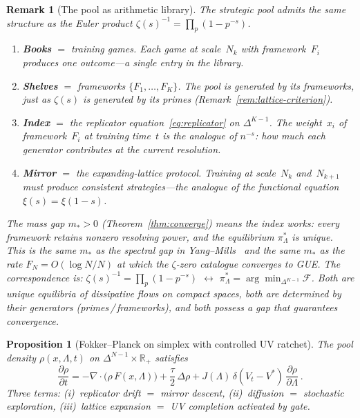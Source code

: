 \documentclass[11pt,a4paper]{article}
\newtheorem{proposition}[theorem]{Proposition}
\newtheorem{remark}[theorem]{Remark}
\begin{document}
\begin{remark}[The pool as arithmetic library]%
\label{rem:pool-library}
The strategic pool admits the same structure as the
Euler product $\zeta(s)^{-1} = \prod_p (1 - p^{-s})$.
\begin{enumerate}[nosep, label=\textup{(\roman*)}]
\item \textbf{Books} $=$ training games.
  Each game at scale~$N_k$ with framework~$F_i$ produces one
  outcome---a single entry in the library.
\item \textbf{Shelves} $=$ frameworks $\{F_1, \dots, F_K\}$.
  The pool is generated by its frameworks,
  just as $\zeta(s)$ is generated by its primes
  (Remark~\ref{rem:lattice-criterion}).
\item \textbf{Index} $=$ the replicator equation~\eqref{eq:replicator}
  on $\Delta^{K-1}$.
  The weight~$x_i$ of framework~$F_i$ at training time~$t$
  is the analogue of $n^{-s}$: how much each generator
  contributes at the current resolution.
\item \textbf{Mirror} $=$ the expanding-lattice protocol.
  Training at scale~$N_k$ and~$N_{k+1}$ must produce
  consistent strategies---the analogue of the functional
  equation $\xi(s) = \xi(1-s)$.
\end{enumerate}
The mass gap $m_* > 0$ (Theorem~\ref{thm:converge}) means
the index works: every framework retains nonzero resolving power,
and the equilibrium $\pi^*_\Lambda$ is unique.
This is the same $m_*$ as the spectral gap in
Yang--Mills~\cite{YM54} and the same $m_*$ as the rate
$F_N = O(\log N / N)$ at which the $\zeta$-zero catalogue
converges to GUE\@.
The correspondence is:
$\zeta(s)^{-1} = \prod_p(1 - p^{-s})$ $\leftrightarrow$
$\pi^*_\Lambda = \arg\min_{\Delta^{K-1}} \mathcal{F}$.
Both are unique equilibria of dissipative flows on compact spaces,
both are determined by their generators (primes\,/\,frameworks),
and both possess a gap that guarantees convergence.
\end{remark}

\begin{proposition}[Fokker--Planck on simplex with controlled UV ratchet]%
\label{prop:fpe}
The pool density $\rho(x, \Lambda, t)$ on
$\Delta^{N-1} \times \mathbb{R}_+$ satisfies
\begin{equation}\label{eq:fpe}
  \frac{\partial\rho}{\partial t}
    = -\nabla \cdot \bigl(\rho\, F(x, \Lambda)\bigr)
      + \frac{\tau}{2}\,\Delta\rho
      + J(\Lambda)\,\delta(V_t - V^*)
        \,\frac{\partial\rho}{\partial\Lambda}\,.
\end{equation}
Three terms:
\textup{(i)}~replicator drift $=$ mirror descent,
\textup{(ii)}~diffusion $=$ stochastic exploration,
\textup{(iii)}~lattice expansion $=$ UV completion activated
by gate.
\end{proposition}
\end{document}

